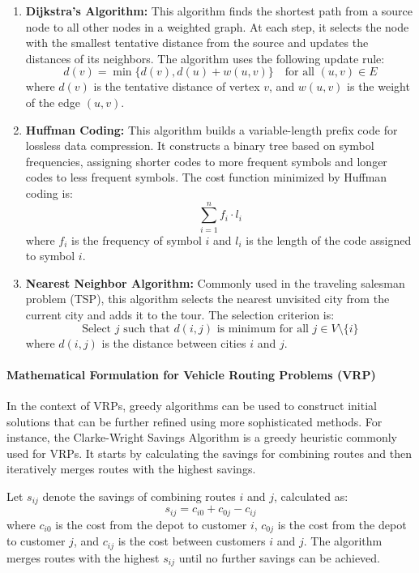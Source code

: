 \documentclass{article}
\begin{document}
    \begin{enumerate}
        \item \textbf{Dijkstra’s Algorithm:} This algorithm finds the shortest path from a source node to all other nodes in a weighted graph. At each step, it selects the node with the smallest tentative distance from the source and updates the distances of its neighbors. The algorithm uses the following update rule:
        \[
            d(v) = \min \{ d(v), d(u) + w(u, v) \} \quad \text{for all } (u, v) \in E
        \]
        where \(d(v)\) is the tentative distance of vertex \(v\), and \(w(u, v)\) is the weight of the edge \((u, v)\). \cite{brilliant_dijkstra}

        \item \textbf{Huffman Coding:} This algorithm builds a variable-length prefix code for lossless data compression. It constructs a binary tree based on symbol frequencies, assigning shorter codes to more frequent symbols and longer codes to less frequent symbols. The cost function minimized by Huffman coding is:
        \[
            \sum_{i=1}^n f_i \cdot l_i
        \]
        where \(f_i\) is the frequency of symbol \(i\) and \(l_i\) is the length of the code assigned to symbol \(i\). \cite{walkccc2024}

        \item \textbf{Nearest Neighbor Algorithm:} Commonly used in the traveling salesman problem (TSP), this algorithm selects the nearest unvisited city from the current city and adds it to the tour. The selection criterion is:
        \[
            \text{Select } j \text{ such that } d(i, j) \text{ is minimum for all } j \in V \setminus \{i\}
        \]
        where \(d(i, j)\) is the distance between cities \(i\) and \(j\). \cite{richar2012}
    \end{enumerate}

    \paragraph{Mathematical Formulation for Vehicle Routing Problems (VRP)}

    In the context of VRPs, greedy algorithms can be used to construct initial solutions that can be further refined using more sophisticated methods. For instance, the Clarke-Wright Savings Algorithm is a greedy heuristic commonly used for VRPs. It starts by calculating the savings for combining routes and then iteratively merges routes with the highest savings.

    Let \(s_{ij}\) denote the savings of combining routes \(i\) and \(j\), calculated as:
    \[
        s_{ij} = c_{i0} + c_{0j} - c_{ij}
    \]
    where \(c_{i0}\) is the cost from the depot to customer \(i\), \(c_{0j}\) is the cost from the depot to customer \(j\), and \(c_{ij}\) is the cost between customers \(i\) and \(j\). The algorithm merges routes with the highest \(s_{ij}\) until no further savings can be achieved. \cite[pp. 3-5, 62-65]{toth2014vehicle}
\end{document}

